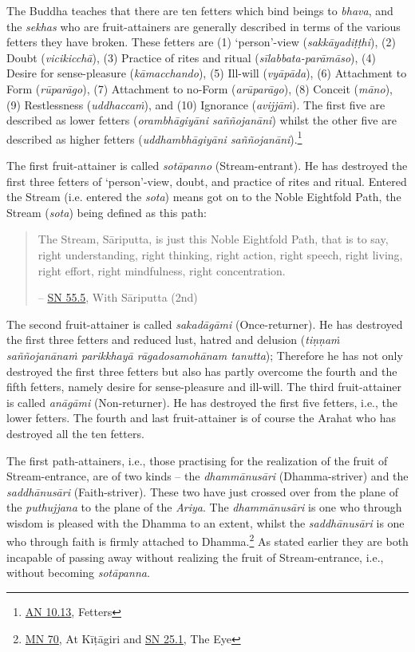 The Buddha teaches that there are ten fetters which bind beings to \emph{bhava}, and the \emph{sekhas} who are fruit-attainers are generally described in terms of the various fetters they have broken. These fetters are (1) `person'-view (\emph{sakkāyadiṭṭhi}), (2) Doubt (\emph{vicikicchā}), (3) Practice of rites and ritual (\emph{sīlabbata-parāmāso}), (4) Desire for sense-pleasure (\emph{kāmacchando}), (5) Ill-will (\emph{vyāpāda}), (6) Attachment to Form (\emph{rūparāgo}), (7) Attachment to no-Form (\emph{arūparāgo}), (8) Conceit (\emph{māno}), (9) Restlessness (\emph{uddhaccaṁ}), and (10) Ignorance (\emph{avijjāṁ}). The first five are described as lower fetters (\emph{orambhāgiyāni saññojanāni}) whilst the other five are described as higher fetters (\emph{uddhambhāgiyāni saññojanāni}).\footnote{\href{https://suttacentral.net/an10.13/en/bodhi}{AN 10.13}, Fetters}

The first fruit-attainer is called \emph{sotāpanno} (Stream-entrant). He has destroyed the first three fetters of `person'-view, doubt, and practice of rites and ritual. Entered the Stream (i.e. entered the \emph{sota}) means got on to the Noble Eightfold Path, the Stream (\emph{sota}) being defined as this path:

\begin{quote}
The Stream, Sāriputta, is just this Noble Eightfold Path, that is to say, right understanding, right thinking, right action, right speech, right living, right effort, right mindfulness, right concentration.

 -- \href{https://suttacentral.net/sn55.5/en/sujato}{SN 55.5}, With Sāriputta (2nd)
\end{quote}

The second fruit-attainer is called \emph{sakadāgāmi} (Once-returner). He has destroyed the first three fetters and reduced lust, hatred and delusion (\emph{tiṇṇaṁ saññojanānaṁ parikkhayā rāgadosamohānam tanutta}); Therefore he has not only destroyed the first three fetters but also has partly overcome the fourth and the fifth fetters, namely desire for sense-pleasure and ill-will. The third fruit-attainer is called \emph{anāgāmi} (Non-returner). He has destroyed the first five fetters, i.e., the lower fetters. The fourth and last fruit-attainer is of course the Arahat who has destroyed all the ten fetters.

The first path-attainers, i.e., those practising for the realization of the fruit of Stream-entrance, are of two kinds -- the \emph{dhammānusāri} (Dhamma-striver) and the \emph{saddhānusāri} (Faith-striver). These two have just crossed over from the plane of the \emph{puthujjana} to the plane of the \emph{Ariya}. The \emph{dhammānusāri} is one who through wisdom is pleased with the Dhamma to an extent, whilst the \emph{saddhānusāri} is one who through faith is firmly attached to Dhamma.\footnote{\href{https://suttacentral.net/mn70/en/bodhi}{MN 70}, At Kīṭāgiri and \href{https://suttacentral.net/sn25.1/en/sujato}{SN 25.1}, The Eye} As stated earlier they are both incapable of passing away without realizing the fruit of Stream-entrance, i.e., without becoming \emph{sotāpanna}.

